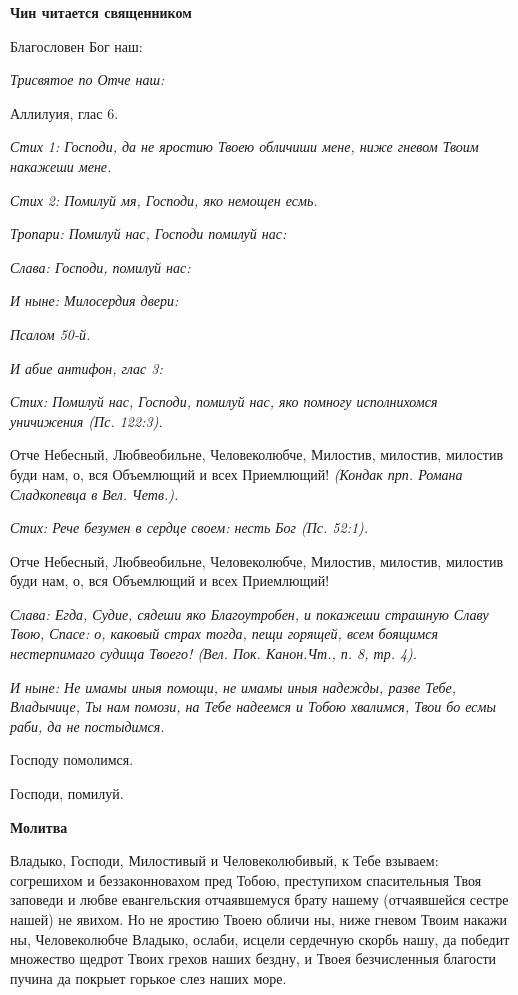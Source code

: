 \bfseries Чин читается священником\normalfont{}


Благословен Бог наш:


\itshape Трисвятое по\normalfont{} Отче наш:


Аллилуия, глас 6.


\itshape Стих 1:\normalfont{} Господи, да не яростию Твоею обличиши мене, ниже гневом Твоим накажеши мене.


\itshape Стих 2:\normalfont{} Помилуй мя, Господи, яко немощен есмь.


\itshape Тропари:\normalfont{} Помилуй нас, Господи помилуй нас:


\itshape Слава:\normalfont{} Господи, помилуй нас:


\itshape И ныне:\normalfont{} Милосердия двери:


\itshape Псалом 50-й.\normalfont{}


\itshape И абие антифон, глас 3:\normalfont{}


\itshape Стих:\normalfont{} Помилуй нас, Господи, помилуй нас, яко помногу исполнихомся уничижения \itshape (Пс. 122:3)\normalfont{}.


Отче Небесный, Любвеобильне, Человеколюбче, Милостив, милостив, милостив буди нам, о, вся Объемлющий и всех Приемлющий! \itshape (Кондак прп. Романа Сладкопевца в Вел. Четв.)\normalfont{}.


\itshape Стих:\normalfont{} Рече безумен в сердце своем: несть Бог \itshape (Пс. 52:1)\normalfont{}.


Отче Небесный, Любвеобильне, Человеколюбче, Милостив, милостив, милостив буди нам, о, вся Объемлющий и всех Приемлющий!


\itshape Слава:\normalfont{} Егда, Судие, сядеши яко Благоутробен, и покажеши страшную Славу Твою, Спасе: о, каковый страх тогда, пещи горящей, всем боящимся нестерпимаго судища Твоего! \itshape (Вел. Пок. Канон.Чт., п. 8, тр. 4)\normalfont{}.


\itshape И ныне:\normalfont{} Не имамы иныя помощи, не имамы иныя надежды, разве Тебе, Владычице, Ты нам помози, на Тебе надеемся и Тобою хвалимся, Твои бо есмы раби, да не постыдимся.


Господу помолимся.


Господи, помилуй.





\bfseries Молитва\normalfont{}


Владыко, Господи, Милостивый и Человеколюбивый, к Тебе взываем: согрешихом и беззаконновахом пред Тобою, преступихом спасительныя Твоя заповеди и любве евангельския отчаявшемуся брату нашему (отчаявшейся сестре нашей) не явихом. Но не яростию Твоею обличи ны, ниже гневом Твоим накажи ны, Человеколюбче Владыко, ослаби, исцели сердечную скорбь нашу, да победит множество щедрот Твоих грехов наших бездну, и Твоея безчисленныя благости пучина да покрыет горькое слез наших море.


